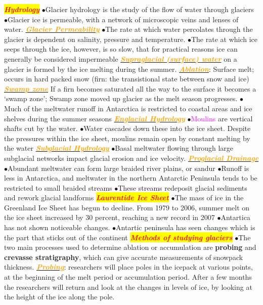 \documentclass{article}
\newcommand{\ddd}{$\bullet$}
\newcommand{\red}[1]{\textcolor{red}{#1}}
\newcommand{\pink}[1]{\textcolor{magenta}{#1}}
\newcommand{\orange}[1]{\textcolor{orange}{#1}}
\newcommand{\mysection}[1]{\colorbox{yellow}{\textbf{\textit{\red{#1}}}}}
\newcommand{\mysub}[1]{\underline{\textbf{{\textit{\orange{#1}}}}}}
\newcommand{\vocab}[1]{{\pink{#1}}}
\begin{document}
\begin{multicols*}{4}
	    \mysection{Hydrology}
	        \ddd Glacier hydrology is the study of the flow of water through glaciers
            \ddd Glacier ice is permeable, with a network of microscopic veins and lenses of water.
            \mysub{Glacier Permeability} 
                \ddd The rate at which water percolates through the glacier is dependent on salinity, pressure and temperature. 
                \ddd  The rate at which ice seeps through the ice, however, is so slow, that for practical reasons ice can generally be considered impermeable
            \mysub{Supraglacial (surface) water} on a glacier is formed by the ice melting during the summer.
            \mysub{Ablation}: Surface melt; occurs in hard packed snow (firn: the transistional state between snow and ice)
            \mysub{Swamp zone} If a firn becomes saturated all the way to the surface it becomes a ‘swamp zone’; Swamp zone moved up glacier as the melt season progresses.
            \ddd Much of the meltwater runoff in Antarctica is restricted to coastal areas and ice shelves during the summer seasons
            \mysub{Englacial Hydrology}
                \ddd \vocab{Moulins} are vertical shafts cut by the water.
                \ddd Water cascades down these into the ice sheet. Despite the pressures within the ice sheet, moulins remain open by constant melting by the water
            \mysub{Subglacial Hydrology}
                \ddd Basal meltwater flowing through large subglacial networks impact glacial erosion and ice velocity. 
            \mysub{Proglacial Drainage}
                \ddd Abundant meltwater can form large braided river plains, or sandur
                \ddd Runoff is less in Antarctica, and meltwater in the northern Antarctic Peninsula tends to be restricted to small braided streams
                \ddd These streams redeposit glacial sediments and rework glacial landforms
        \mysection{Laurentide Ice Sheet}
            \ddd The mass of ice in the Greenland Ice Sheet has begun to decline. From 1979 to 2006, summer melt on the ice sheet increased by 30 percent, reaching a new record in 2007
            \ddd Antartica has not shown noticeable changes. 
            \ddd Antartic peninsula has seen changes which is the part that sticks out of the continent
        \mysection{Methods of studying glaciers}
            \ddd The two main processes used to determine ablation or accumulation are \textbf{probing} and \textbf{crevasse stratigraphy}, which can give accurate measurements of snowpack thickness.
            \mysub{Probing}: researchers will place poles in the icepack at various points, at the beginning of the melt period or accumulation period. After a few months the researchers will return and look at the changes in levels of ice, by looking at the height of the ice along the pole.

\end{multicols*}
\end{document}

